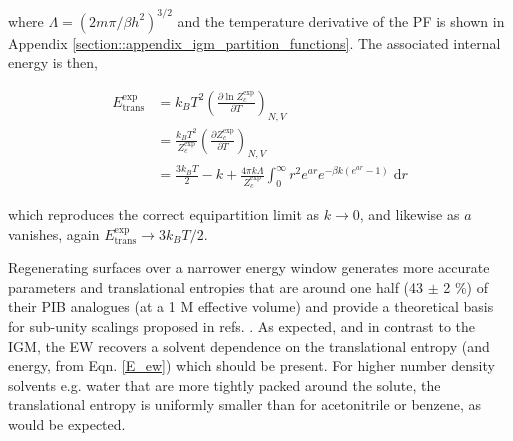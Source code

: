 \documentclass[../main.tex]{subfiles}
\begin{document}
where $\Lambda = (2m\pi/\beta h^2)^{3/2}$ and the temperature derivative of the PF is shown in Appendix \ref{section::appendix_igm_partition_functions}. The associated internal energy is then,

\begin{equation}
\begin{aligned}
E_\text{trans}^\text{exp} &= k_BT^2 \left(\frac{\partial \ln Z_c^\text{exp}}{\partial T} \right)_{N, V}  \\
&= \frac{k_BT^2}{Z_c^\text{exp}} \left(\frac{\partial Z_c^\text{exp}}{\partial T} \right)_{N, V} \\
&=\frac{3k_BT}{2} - k + \frac{4 \pi k \Lambda}{Z_c^\text{exp}} \int_0^\infty r^2 e^{ar} e^{-\beta k (e^{ar} - 1)} \;\text{d}r
\end{aligned}
\label{E_ew}
\end{equation}

which reproduces the correct equipartition limit as $k \rightarrow 0$, and likewise as $a$ vanishes, again $E_\text{trans}^\text{exp} \rightarrow 3k_BT/2$.

Regenerating surfaces over a narrower energy window generates more accurate parameters and translational entropies that are around one half (43 $\pm$ 2 \%) of their PIB analogues (at a 1 M effective volume) and provide a theoretical basis for sub-unity scalings proposed in refs. \cite{Tanaka2011, Deubel2006, Li2016, DiTommaso2010}. As expected, and in contrast to the IGM, the EW recovers a solvent dependence on the  translational entropy (and energy, from Eqn. \eqref{E_ew}) which should be present. For higher number density solvents e.g. water that are more tightly packed around the solute, the translational entropy is uniformly smaller than for acetonitrile or benzene, as would be expected.
\vspace{0.2cm}
\end{document}
